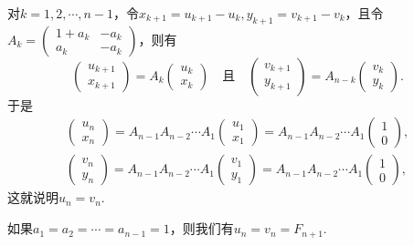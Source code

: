 \begin{solution}
  对$k=1,2,\cdots,n-1$，令$x_{k+1}=u_{k+1}-u_k,y_{k+1}=v_{k+1}-v_k$，且令$A_k=\begin{pmatrix}
    1 + a_k & - a_k \\
    a_k & - a_k
  \end{pmatrix}$，则有
  \[
    \begin{pmatrix}
      u_{k+1} \\
      x_{k+1}
    \end{pmatrix} = A_k\begin{pmatrix}
      u_k \\ x_k
    \end{pmatrix} \quad \text{且} \quad
    \begin{pmatrix}
      v_{k+1} \\
      y_{k+1}
    \end{pmatrix} = A_{n-k}\begin{pmatrix}
      v_k \\ y_k
    \end{pmatrix}.
  \]
  于是
  \begin{gather*}
    \begin{pmatrix}
      u_n \\ x_n
    \end{pmatrix} = A_{n-1}A_{n-2}\cdots A_1
    \begin{pmatrix}
      u_1 \\ x_1
    \end{pmatrix} = A_{n-1}A_{n-2}\cdots A_1
    \begin{pmatrix}
      1 \\ 0
    \end{pmatrix}, \\
    \begin{pmatrix}
      v_n \\ y_n
    \end{pmatrix} = A_{n-1}A_{n-2}\cdots A_1
    \begin{pmatrix}
      v_1 \\ y_1
    \end{pmatrix} = A_{n-1}A_{n-2}\cdots A_1
    \begin{pmatrix}
      1 \\ 0
    \end{pmatrix},
  \end{gather*}
  这就说明$u_n=v_n$.
\end{solution}
\begin{remark}
  如果$a_1=a_2=\cdots=a_{n-1}=1$，则我们有$u_n=v_n=F_{n+1} $.
\end{remark}

